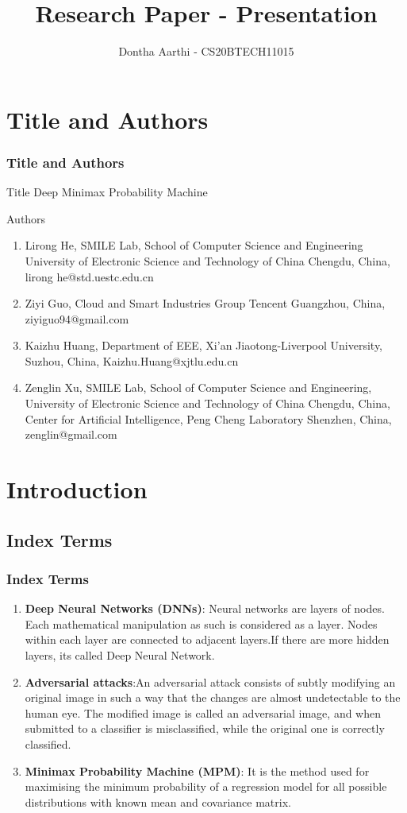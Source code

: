 \documentclass{beamer}
\title{Research Paper - Presentation}
\author{Dontha Aarthi - CS20BTECH11015}
\begin{document}
\begin{frame}
\titlepage
\end{frame}
\section{Title and Authors}
\begin{frame}
\frametitle{Title and Authors}
\begin{block}{Title}
Deep Minimax Probability Machine

\end{block}
\begin{block}{Authors}
\begin{enumerate}
    \item Lirong He, SMILE Lab, School of Computer Science and Engineering
    University of Electronic Science and Technology of China Chengdu, China, lirong he@std.uestc.edu.cn
    \item Ziyi Guo, Cloud and Smart Industries Group Tencent
Guangzhou, China, ziyiguo94@gmail.com
    \item Kaizhu Huang, Department of EEE, Xi’an Jiaotong-Liverpool University, Suzhou, China, Kaizhu.Huang@xjtlu.edu.cn\\
    \item Zenglin Xu, SMILE Lab, School of Computer Science and Engineering, University of Electronic Science and Technology of China
Chengdu, China, Center for Artificial Intelligence, Peng Cheng Laboratory
Shenzhen, China, zenglin@gmail.com
\end{enumerate}

\end{block}
\end{frame}
\section{\textbf{Introduction}}
\subsection*{Index Terms}
\begin{frame}[fragile]
\frametitle{Index Terms}
\begin{enumerate}
    \item \textbf{Deep Neural Networks (DNNs)}: Neural networks are layers of nodes. Each mathematical manipulation as such is considered as a layer. Nodes within each layer are connected to adjacent layers.If there are more hidden layers, its called Deep Neural Network.
    \item \textbf{Adversarial attacks}:An adversarial attack consists of subtly modifying an original image in such a way that the changes are almost undetectable to the human eye. The modified image is called an adversarial image, and when submitted to a classifier is misclassified, while the original one is correctly classified.
    \item \textbf{Minimax Probability Machine (MPM)}: It is the method used for maximising the minimum probability of a regression model for all possible distributions with known mean and covariance matrix.
\end{enumerate}
\end{frame}
\end{document}
